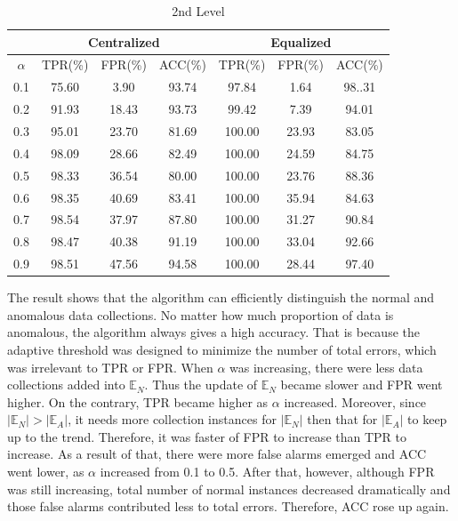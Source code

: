 \documentclass[10pt,conference,letterpaper]{IEEEtran}
\begin{document}
			\begin{table}[!ht]
				\centering
				\caption{2nd Level}
				\label{tab:syn-result-2nd}
				\begin{tabular}{|c|c|c|c|c|c|c|}
					\hline
					& \multicolumn{3}{c|}{Centralized} & \multicolumn{3}{c|}{Equalized}\\
					\hline
					$\alpha$ & TPR(\%) & FPR(\%) & ACC(\%) & TPR(\%) & FPR(\%) & ACC(\%) \\ 
					\hline
					0.1 & 75.60 & 3.90 & 93.74 & 97.84 & 1.64 & 98..31 \\ 
					\hline
					0.2 & 91.93 & 18.43 & 93.73 & 99.42 & 7.39 & 94.01 \\ 
					\hline
					0.3 & 95.01 & 23.70 & 81.69 & 100.00 & 23.93 & 83.05 \\ 
					\hline
					0.4 & 98.09 & 28.66 & 82.49 & 100.00 & 24.59 & 84.75 \\ 
					\hline
					0.5 & 98.33 & 36.54 & 80.00 & 100.00 & 23.76 & 88.36 \\ 
					\hline
					0.6 & 98.35 & 40.69 & 83.41 & 100.00 & 35.94 & 84.63 \\ 
					\hline
					0.7 & 98.54 & 37.97 & 87.80 & 100.00 & 31.27 & 90.84 \\ 
					\hline
					0.8 & 98.47 & 40.38 & 91.19 & 100.00 & 33.04 & 92.66 \\ 
					\hline
					0.9 & 98.51 & 47.56 & 94.58 & 100.00 & 28.44 & 97.40\\
					\hline
				\end{tabular} 
			\end{table}
			
			The result shows that the algorithm can efficiently distinguish the normal and anomalous data collections. No matter how much proportion of data is anomalous, the algorithm always gives a high accuracy. That is because the adaptive threshold was designed to minimize the number of total errors, which was irrelevant to TPR or FPR. When $\alpha$ was increasing, there were less data collections added into $\mathbb{E}_N$. Thus the update of $\mathbb{E}_N$ became slower and FPR went higher. On the contrary, TPR became higher as $\alpha$ increased. Moreover, since $|\mathbb{E}_N| > |\mathbb{E}_A|$, it needs more collection instances for $|\mathbb{E}_N|$ then that for $|\mathbb{E}_A|$ to keep up to the trend. Therefore, it was faster of FPR to increase than TPR to increase. As a result of that, there were more false alarms emerged and ACC went lower, as $\alpha$ increased from 0.1 to 0.5. After that, however, although FPR was still increasing, total number of normal instances decreased dramatically and those false alarms contributed less to total errors. Therefore, ACC rose up again.
	
\end{document}
